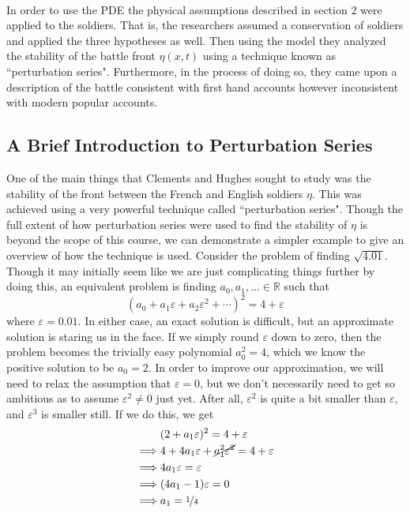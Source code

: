 \documentclass{article}
\begin{document}
\\
In order to use the PDE the physical assumptions described in section 2 were applied to the soldiers. That is, the researchers assumed a conservation of soldiers and applied the three hypotheses as well. Then using the model they analyzed the stability of the battle front $\eta(x,t)$ using a technique known as ``perturbation series". Furthermore, in the process of doing so, they came upon a description of the battle consistent with first hand accounts however inconsistent with modern popular accounts.

\subsection{A Brief Introduction to Perturbation Series}
One of the main things that Clements and Hughes sought to study was the stability of the front between the French and English soldiers $\eta$. This was achieved using a very powerful technique called ``perturbation series". Though the full extent of how perturbation series were used to find the stability of $\eta$ is beyond the scope of this course, we can demonstrate a simpler example to give an overview of how the technique is used. Consider the problem of finding $\sqrt{4.01}$. Though it may initially seem like we are just complicating things further by doing this, an equivalent problem is finding $a_0,a_1,...\in\mathbb R$ such that
\[
    (a_0+a_1\varepsilon+a_2\varepsilon^2+\cdots)^2=4+\varepsilon
\]
where $\varepsilon=0.01$. In either case, an exact solution is difficult, but an approximate solution is staring us in the face. If we simply round $\varepsilon$ down to zero, then the problem becomes the trivially easy polynomial $a_0^2=4$, which we know the positive solution to be $a_0=2$. In order to improve our approximation, we will need to relax the assumption that $\varepsilon=0$, but we don't necessarily need to get so ambitious as to assume $\varepsilon^2\ne 0$ just yet. After all, $\varepsilon^2$ is quite a bit smaller than $\varepsilon$, and $\varepsilon^3$ is smaller still. If we do this, we get
\begin{align*}
    &(2+a_1\varepsilon)^2=4+\varepsilon\\
    \implies& 4+4a_1\varepsilon+\cancel{a_1^2\varepsilon^2}=4+\varepsilon\\
    \implies& 4a_1\varepsilon=\varepsilon\\
    \implies& (4a_1-1)\varepsilon =0\\
    \implies& a_1=\nicefrac{1}{4}
\end{align*}
\end{document}
